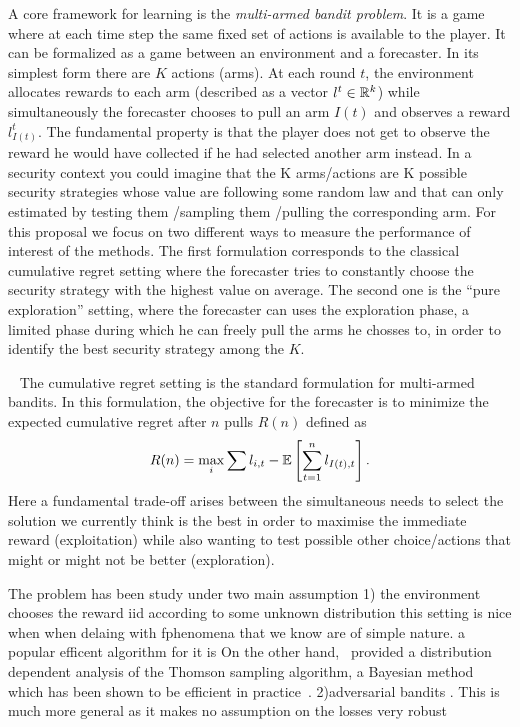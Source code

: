 A core framework for learning is the \textit{multi-armed bandit problem}. It is a game where at each time step the same fixed set of actions is available to the player. It can be formalized as a game between an environment and a forecaster. In its simplest form there are $K$ actions (arms). At each round $t$, the environment allocates rewards to each arm (described as a vector $l^t\in\mathbb{R}^k$) while simultaneously the forecaster chooses to pull an arm $I(t)$ and observes a reward $l^t_{I(t)}$.  The fundamental property is that the player does not get to observe the reward he would have collected if he had selected another arm instead. In a security context you could imagine that the K arms/actions are K possible security strategies whose value are following some random law and that can  only estimated by testing  them /sampling them /pulling the corresponding arm. For this proposal we focus on two different ways to measure the performance of interest of the methods.  The first formulation corresponds to the classical cumulative regret setting where the forecaster tries to constantly choose the security strategy with the highest value on average.  The second one is the ``pure exploration'' setting, where the forecaster can uses the exploration phase, a limited phase during which he can freely pull the arms he chosses to, in order to identify the best  security strategy among the $K$.



\textbullet~ The cumulative regret setting is the standard formulation for multi-armed bandits. In this formulation, the objective for the forecaster is to minimize the expected cumulative regret after $n$ pulls $R(n)$ defined as
%
\begin{equation*}
R(n)=\max_i\sum l_{i,t}-{\mathbb{E}}\left[\sum_{t=1}^n l_{I(t),t}\right].
\end{equation*}
%
Here a fundamental trade-off arises between the simultaneous needs to select the solution we currently think is the best in order to maximise the immediate reward  (exploitation)  while also wanting to test possible other choice/actions that might or might not be better (exploration).

The problem has been study under two main assumption 1) the environment chooses the reward iid according to some unknown distribution this setting is nice when when delaing with fphenomena that we know are of simple nature. a popular efficent  algorithm for it is On the other hand,~\mbox{\cite{Kaufmann12TS}} provided a distribution dependent analysis of the Thomson sampling algorithm, a Bayesian method which has been shown to be efficient in practice~\cite{Chapelle11EE}. 2)adversarial bandits 
\cite{Auer03NS}. This is much more general as it makes no assumption on the losses very robust


